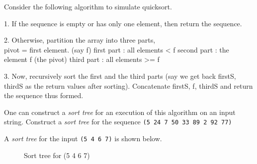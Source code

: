 Consider the following algorithm to simulate quicksort. 

1. If the sequence is empty or has only one element, then return the
   sequence. 

2. Otherwise, partition the array into three parts, \\
      pivot = first element. (say f)
   first part  : all elements < f
   second part : the element f (the pivot)
   third part  : all elements >= f

3. Now, recursively sort the first and the third parts (say we get
   back firstS, thirdS as the return values after
   sorting). Concatenate firstS, f, thirdS and return the sequence
   thus formed.

One can construct a {\it sort tree} for an execution of this
algorithm on an input string. Construct a {\it sort tree} for the
sequence {\tt (5 24 7 50 33 89 2 92 77)}

A {\it sort tree} for the input {\tt (5 4 6 7)} is shown below.

\begin{figure}[h]
\centerline{}
\caption{Sort tree for (5 4 6 7)}
\end{figure}






